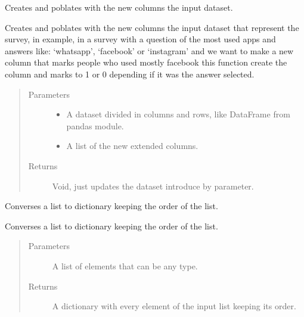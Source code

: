 \documentclass[letterpaper,10pt,english]{sphinxmanual}
\begin{document}
\begin{fulllineitems}
\label{\detokenize{index:SurveyHumpbackWhale.create_and_poblate_new_columns}}
Creates and poblates with the new columns the input dataset.

Creates and poblates with the new columns the input dataset that
represent the survey, in example, in a survey with a question of the most
used apps and answers like: ‘whatsapp’, ‘facebook’ or ‘instagram’ and we
want to make a new column that marks people who used mostly facebook this
function create the column and marks to 1 or 0 depending if it was
the answer selected.
\begin{quote}\begin{description}
\item[{Parameters}] \leavevmode\begin{itemize}
\item {} 
 \textendash{} A dataset divided in columns and rows, like DataFrame from
pandas module.

\item {} 
 \textendash{} A list of the new extended columns.

\end{itemize}

\item[{Returns}] \leavevmode
Void, just updates the dataset introduce by parameter.

\end{description}\end{quote}

\end{fulllineitems}


\begin{fulllineitems}
\label{\detokenize{index:SurveyHumpbackWhale.list_to_num_dict}}
Converses a list to dictionary keeping the order of the list.

Converses a list to dictionary keeping the order of the list.
\begin{quote}\begin{description}
\item[{Parameters}] \leavevmode
{} \textendash{} A list of elements that can be any type.

\item[{Returns}] \leavevmode
A dictionary with every element of the input list keeping its order.

\end{description}\end{quote}

\end{fulllineitems}
\end{document}
